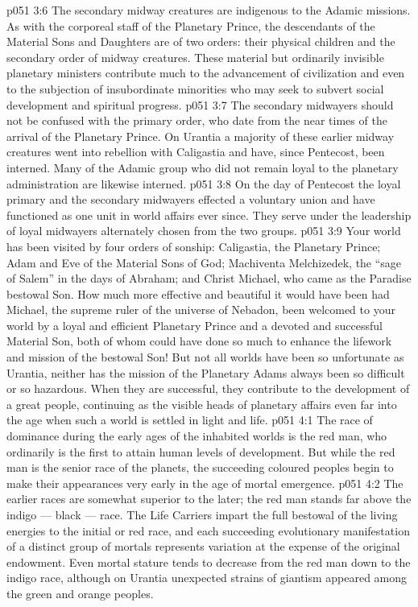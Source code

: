 \vs p051 3:6 \pc The secondary midway creatures are indigenous to the Adamic missions. As with the corporeal staff of the Planetary Prince, the descendants of the Material Sons and Daughters are of two orders: their physical children and the secondary order of midway creatures. These material but ordinarily invisible planetary ministers contribute much to the advancement of civilization and even to the subjection of insubordinate minorities who may seek to subvert social development and spiritual progress.
\vs p051 3:7 The secondary midwayers should not be confused with the primary order, who date from the near times of the arrival of the Planetary Prince. On Urantia a majority of these earlier midway creatures went into rebellion with Caligastia and have, since Pentecost, been interned. Many of the Adamic group who did not remain loyal to the planetary administration are likewise interned.
\vs p051 3:8 On the day of Pentecost the loyal primary and the secondary midwayers effected a voluntary union and have functioned as one unit in world affairs ever since. They serve under the leadership of loyal midwayers alternately chosen from the two groups.
\vs p051 3:9 \pc Your world has been visited by four orders of sonship: Caligastia, the Planetary Prince; Adam and Eve of the Material Sons of God; Machiventa Melchizedek, the “sage of Salem” in the days of Abraham; and Christ Michael, who came as the Paradise bestowal Son. How much more effective and beautiful it would have been had Michael, the supreme ruler of the universe of Nebadon, been welcomed to your world by a loyal and efficient Planetary Prince and a devoted and successful Material Son, both of whom could have done so much to enhance the lifework and mission of the bestowal Son! But not all worlds have been so unfortunate as Urantia, neither has the mission of the Planetary Adams always been so difficult or so hazardous. When they are successful, they contribute to the development of a great people, continuing as the visible heads of planetary affairs even far into the age when such a world is settled in light and life.
\vs p051 4:1 The race of dominance during the early ages of the inhabited worlds is the red man, who ordinarily is the first to attain human levels of development. But while the red man is the senior race of the planets, the succeeding coloured peoples begin to make their appearances very early in the age of mortal emergence.
\vs p051 4:2 The earlier races are somewhat superior to the later; the red man stands far above the indigo --- black --- race. The Life Carriers impart the full bestowal of the living energies to the initial or red race, and each succeeding evolutionary manifestation of a distinct group of mortals represents variation at the expense of the original endowment. Even mortal stature tends to decrease from the red man down to the indigo race, although on Urantia unexpected strains of giantism appeared among the green and orange peoples.
